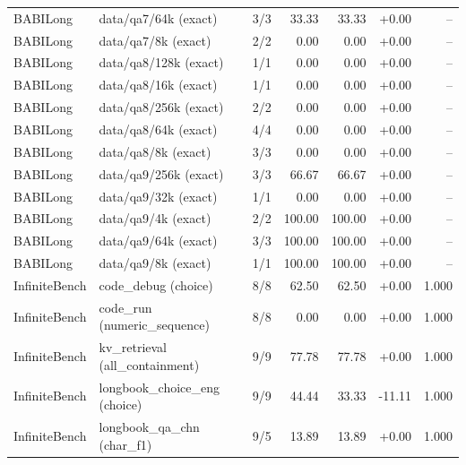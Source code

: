 \begin{longtable}{lp{3.1cm}rrrrr}
BABILong & \raggedright data/\allowbreak qa7/\allowbreak 64k {\tiny (exact)} & 3/3 & 33.33 & 33.33 & +0.00 & -- \\
BABILong & \raggedright data/\allowbreak qa7/\allowbreak 8k {\tiny (exact)} & 2/2 & 0.00 & 0.00 & +0.00 & -- \\
BABILong & \raggedright data/\allowbreak qa8/\allowbreak 128k {\tiny (exact)} & 1/1 & 0.00 & 0.00 & +0.00 & -- \\
BABILong & \raggedright data/\allowbreak qa8/\allowbreak 16k {\tiny (exact)} & 1/1 & 0.00 & 0.00 & +0.00 & -- \\
BABILong & \raggedright data/\allowbreak qa8/\allowbreak 256k {\tiny (exact)} & 2/2 & 0.00 & 0.00 & +0.00 & -- \\
BABILong & \raggedright data/\allowbreak qa8/\allowbreak 64k {\tiny (exact)} & 4/4 & 0.00 & 0.00 & +0.00 & -- \\
BABILong & \raggedright data/\allowbreak qa8/\allowbreak 8k {\tiny (exact)} & 3/3 & 0.00 & 0.00 & +0.00 & -- \\
BABILong & \raggedright data/\allowbreak qa9/\allowbreak 256k {\tiny (exact)} & 3/3 & 66.67 & 66.67 & +0.00 & -- \\
BABILong & \raggedright data/\allowbreak qa9/\allowbreak 32k {\tiny (exact)} & 1/1 & 0.00 & 0.00 & +0.00 & -- \\
BABILong & \raggedright data/\allowbreak qa9/\allowbreak 4k {\tiny (exact)} & 2/2 & 100.00 & 100.00 & +0.00 & -- \\
BABILong & \raggedright data/\allowbreak qa9/\allowbreak 64k {\tiny (exact)} & 3/3 & 100.00 & 100.00 & +0.00 & -- \\
BABILong & \raggedright data/\allowbreak qa9/\allowbreak 8k {\tiny (exact)} & 1/1 & 100.00 & 100.00 & +0.00 & -- \\
InfiniteBench & \raggedright code\_\allowbreak debug {\tiny (choice)} & 8/8 & 62.50 & 62.50 & +0.00 & 1.000 \\
InfiniteBench & \raggedright code\_\allowbreak run {\tiny (numeric\_sequence)} & 8/8 & 0.00 & 0.00 & +0.00 & 1.000 \\
InfiniteBench & \raggedright kv\_\allowbreak retrieval {\tiny (all\_containment)} & 9/9 & 77.78 & 77.78 & +0.00 & 1.000 \\
InfiniteBench & \raggedright longbook\_\allowbreak choice\_\allowbreak eng {\tiny (choice)} & 9/9 & 44.44 & 33.33 & -11.11 & 1.000 \\
InfiniteBench & \raggedright longbook\_\allowbreak qa\_\allowbreak chn {\tiny (char\_f1)} & 9/5 & 13.89 & 13.89 & +0.00 & 1.000 \\

\end{longtable}
